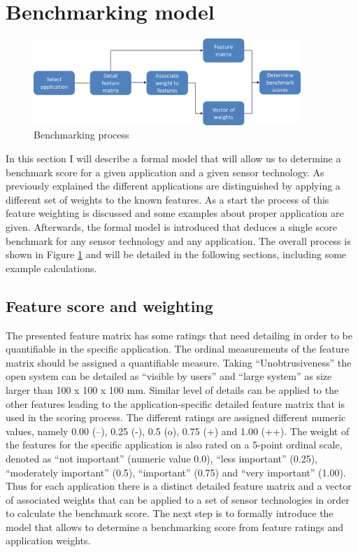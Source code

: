 \section{Benchmarking model}
\begin{figure}[h]
\centering
\includegraphics[width=0.9\textwidth]{images/benchmark_process}
\caption{Benchmarking process}
\label{fig:bench_process}
\end{figure}
In this section I will describe a formal model that will allow us to determine a benchmark score for a given application and a given sensor technology. As previously explained the different applications are distinguished by applying a different set of weights to the known features. As a start the process of this feature weighting is discussed and some examples about proper application are given. Afterwards, the formal model is introduced that deduces a single score benchmark for any sensor technology and any application. The overall process is shown in Figure \ref{fig:bench_process} and will be detailed in the following sections, including some example calculations.
\subsection{Feature score and weighting}
\label{ch:bench_sec_featscore}
The presented feature matrix has some ratings that need detailing in order to be quantifiable in the specific application. The ordinal measurements of the feature matrix should be assigned a quantifiable measure. Taking “Unobtrusiveness” the open system can be detailed as “visible by users” and “large system” as size larger than 100 x 100 x 100 mm. Similar level of details can be applied to the other features leading to the application-specific detailed feature matrix that is used in the scoring process. The different ratings are assigned different numeric values, namely 0.00 (--), 0.25 (-), 0.5 (o), 0.75 (+) and 1.00 (++). The weight of the features for the specific application is also rated on a 5-point ordinal scale, denoted as “not important” (numeric value 0.0), “less important” (0.25), “moderately important” (0.5), “important” (0.75) and “very important” (1.00). Thus for each application there is a distinct detailed feature matrix and a vector of associated weights that can be applied to a set of sensor technologies in order to calculate the benchmark score. The next step is to formally introduce the model that allows to determine a benchmarking score from feature ratings and application weights.
